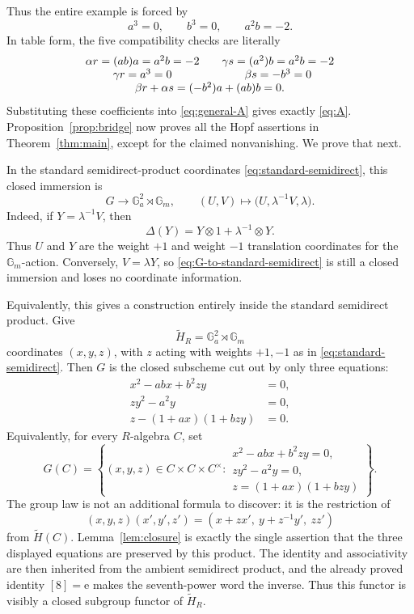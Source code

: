 \documentclass[11pt]{amsart}
\theoremstyle{definition}
\theoremstyle{remark}
\newcommand{\Ga}{\mathbb G_a}
\newcommand{\Gm}{\mathbb G_m}
\newcommand{\ot}{\otimes}
\newcommand{\unit}{\mathrm e}
\begin{document}
Thus the entire example is forced by
\[
 a^3=0,\qquad b^3=0,\qquad a^2b=-2.
\]
In table form, the five compatibility checks are literally
\begin{equation}\label{eq:specialization-table}
 \begin{array}{c@{\qquad}c}
  \alpha r=(ab)a=a^2b=-2&
  \gamma s=(a^2)b=a^2b=-2\\
  \gamma r=a^3=0&
  \beta s=-b^3=0\\
  \multicolumn{2}{c}{
   \beta r+\alpha s=(-b^2)a+(ab)b=0.}
 \end{array}
\end{equation}
Substituting these coefficients into \eqref{eq:general-A} gives exactly
\eqref{eq:A}.  Proposition~\ref{prop:bridge} now proves all the Hopf
assertions in Theorem~\ref{thm:main}, except for the claimed
nonvanishing.  We prove that next.

In the standard semidirect-product coordinates
\eqref{eq:standard-semidirect}, this closed immersion is
\begin{equation}\label{eq:G-to-standard-semidirect}
 G\longrightarrow\Ga^2\rtimes\Gm,\qquad
 (U,V)\longmapsto
 \bigl(U,\lambda^{-1}V,\lambda\bigr).
\end{equation}
Indeed, if \(Y=\lambda^{-1}V\), then
\[
 \Delta(Y)=Y\ot1+\lambda^{-1}\ot Y.
\]
Thus \(U\) and \(Y\) are the weight \(+1\) and weight \(-1\) translation
coordinates for the \(\Gm\)-action.  Conversely,
\(V=\lambda Y\), so \eqref{eq:G-to-standard-semidirect} is still a closed
immersion and loses no coordinate information.

Equivalently, this gives a construction entirely inside the standard
semidirect product.  Give
\[
 \widetilde H_R=\Ga^2\rtimes\Gm
\]
coordinates \((x,y,z)\), with \(z\) acting with weights \(+1,-1\) as in
\eqref{eq:standard-semidirect}.  Then \(G\) is the closed subscheme cut
out by only three equations:
\begin{equation}\label{eq:three-equations-in-semidirect}
 \begin{split}
  x^2-abx+b^2zy&=0,\\
  zy^2-a^2y&=0,\\
 z-(1+ax)(1+bzy)&=0.
 \end{split}
\end{equation}
Equivalently, for every \(R\)-algebra \(C\), set
\[
 G(C)=\left\{(x,y,z)\in C\times C\times C^\times:
 \begin{array}{l}
  x^2-abx+b^2zy=0,\\
  zy^2-a^2y=0,\\
  z=(1+ax)(1+bzy)
 \end{array}\right\}.
\]
The group law is not an additional formula to discover: it is the
restriction of
\[
 (x,y,z)(x',y',z')
   =(x+zx',\ y+z^{-1}y',\ zz')
\]
from \(\widetilde H(C)\).  Lemma~\ref{lem:closure} is exactly the single
assertion that the three displayed equations are preserved by this
product.  The identity and associativity are then inherited from the
ambient semidirect product, and the already proved identity \([8]=\unit\)
makes the seventh-power word the inverse.  Thus this functor is visibly a
closed subgroup functor of \(\widetilde H_R\).
\end{document}
